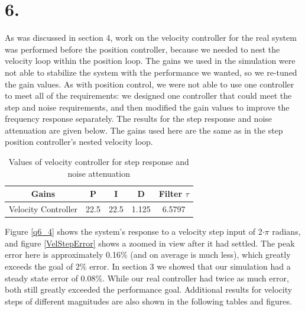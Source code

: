 \documentclass{article}
\theoremstyle{plain}
\theoremstyle{definition}
\theoremstyle{remark}
\begin{document}
\clearpage

\section*{6.}
As was discussed in section 4, work on the velocity controller for the real system was performed before the position controller, because we needed to nest the velocity loop within the position loop. The gains we used in the simulation were not able to stabilize the system with the performance we wanted, so we re-tuned the gain values. As with position control, we were not able to use one controller to meet all of the requirements: we designed one controller that could meet the step and noise requirements, and then modified the gain values to improve the frequency response separately. The results for the step response and noise attenuation are given below. The gains used here are the same as in the step position controller's nested velocity loop.\\

\begin{table}[htb]
\begin{center}
    \begin{tabular}{|c|c|c|c|c|}
        \hline
        Gains & P   & I & D     & Filter $\tau$   \\ \hline
        Velocity Controller       & 22.5   & 22.5    & 1.125    & 6.5797  \\ 
       \hline
    \end{tabular}
\end{center}
\caption{Values of velocity controller for step response and noise attenuation}
\label{velocityGains}
\end{table}

Figure \ref{q6_4} shows the system's response to a velocity step input of 2$\cdot\pi$ radians, and figure \ref{VelStepError} shows a zoomed in view after it had settled. The peak error here is approximately 0.16\% (and on average is much less), which greatly exceeds the goal of 2\% error.  In section 3 we showed that our simulation had a steady state error of 0.08\%. While our real controller had twice as much error, both still greatly exceeded the performance goal. Additional results for velocity steps of different magnitudes are also shown in the following tables and figures.\\
\end{document}
